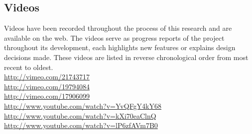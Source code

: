 \pagebreak
\clearpage



\subsection{Videos}

Videos have been recorded throughout the process of this research and are
available on the web. The videos serve as progress reports of the project
throughout its development, each highlights new features or explains
design decisions made. These videos are listed in reverse chronological order
from most recent to oldest. \\
\url{http://vimeo.com/21743717} \\
\url{http://vimeo.com/19794084} \\
\url{http://vimeo.com/17906099} \\
\url{http://www.youtube.com/watch?v=YvQFgY4kY68} \\
\url{http://www.youtube.com/watch?v=kXi70eaClnQ} \\
\url{http://www.youtube.com/watch?v=lP6zfAVm7B0} \\



